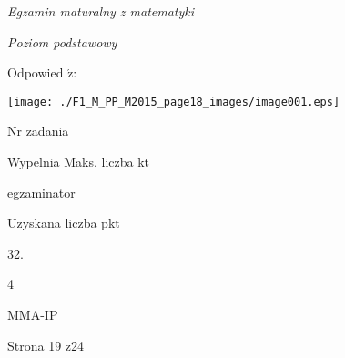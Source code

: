 \documentclass[a4paper,12pt]{article}
\begin{document}
{\it Egzamin maturalny z matematyki}

{\it Poziom podstawowy}

Odpowied $\acute{\mathrm{z}}$:
\begin{center}
\texttt{[image: ./F1\_M\_PP\_M2015\_page18\_images/image001.eps]}
\end{center}
Nr zadania

Wypelnia Maks. liczba kt

egzaminator

Uzyskana liczba pkt

32.

4

MMA-IP

Strona 19 z24
\end{document}
